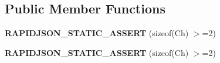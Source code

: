 \subsection*{Public Member Functions}
\begin{DoxyCompactItemize}
\item 
\mbox{\label{structUTF16_a04aeeefa5dcba7c5156bc78a5c1f1557}} 
{\bfseries R\+A\+P\+I\+D\+J\+S\+O\+N\+\_\+\+S\+T\+A\+T\+I\+C\+\_\+\+A\+S\+S\+E\+RT} (sizeof(Ch) $>$=2)
\item 
\mbox{\label{structUTF16_a04aeeefa5dcba7c5156bc78a5c1f1557}} 
{\bfseries R\+A\+P\+I\+D\+J\+S\+O\+N\+\_\+\+S\+T\+A\+T\+I\+C\+\_\+\+A\+S\+S\+E\+RT} (sizeof(Ch) $>$=2)
\end{DoxyCompactItemize}
